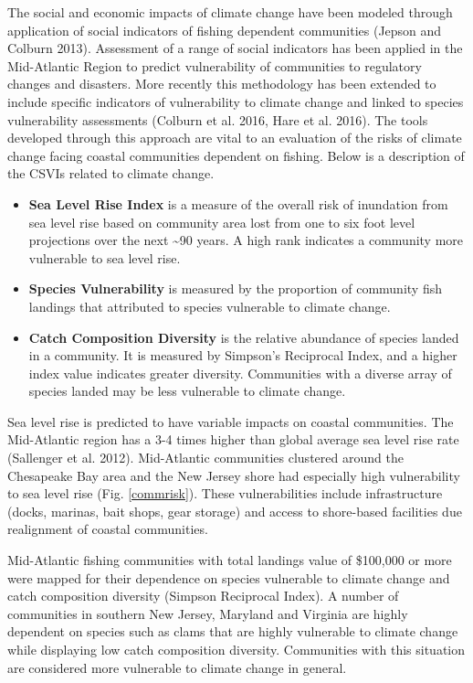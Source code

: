 \documentclass[11pt,]{article}
\providecommand{\tightlist}{%
  \setlength{\itemsep}{0pt}\setlength{\parskip}{0pt}}
\begin{document}
The social and economic impacts of climate change have been modeled
through application of social indicators of fishing dependent
communities (Jepson and Colburn 2013). Assessment of a range of social
indicators has been applied in the Mid-Atlantic Region to predict
vulnerability of communities to regulatory changes and disasters. More
recently this methodology has been extended to include specific
indicators of vulnerability to climate change and linked to species
vulnerability assessments (Colburn et al. 2016, Hare et al. 2016). The
tools developed through this approach are vital to an evaluation of the
risks of climate change facing coastal communities dependent on fishing.
Below is a description of the CSVIs related to climate change.

\begin{itemize}
\tightlist
\item
  \textbf{Sea Level Rise Index} is a measure of the overall risk of
  inundation from sea level rise based on community area lost from one
  to six foot level projections over the next \textasciitilde{}90 years.
  A high rank indicates a community more vulnerable to sea level rise.
\item
  \textbf{Species Vulnerability} is measured by the proportion of
  community fish landings that attributed to species vulnerable to
  climate change.
\item
  \textbf{Catch Composition Diversity} is the relative abundance of
  species landed in a community. It is measured by Simpson's Reciprocal
  Index, and a higher index value indicates greater diversity.
  Communities with a diverse array of species landed may be less
  vulnerable to climate change.
\end{itemize}

Sea level rise is predicted to have variable impacts on coastal
communities. The Mid-Atlantic region has a 3-4 times higher than global
average sea level rise rate (Sallenger et al. 2012). Mid-Atlantic
communities clustered around the Chesapeake Bay area and the New Jersey
shore had especially high vulnerability to sea level rise (Fig.
\ref{commrisk}). These vulnerabilities include infrastructure (docks,
marinas, bait shops, gear storage) and access to shore-based facilities
due realignment of coastal communities.

Mid-Atlantic fishing communities with total landings value of \$100,000
or more were mapped for their dependence on species vulnerable to
climate change and catch composition diversity (Simpson Reciprocal
Index). A number of communities in southern New Jersey, Maryland and
Virginia are highly dependent on species such as clams that are highly
vulnerable to climate change while displaying low catch composition
diversity. Communities with this situation are considered more
vulnerable to climate change in general.
\end{document}
